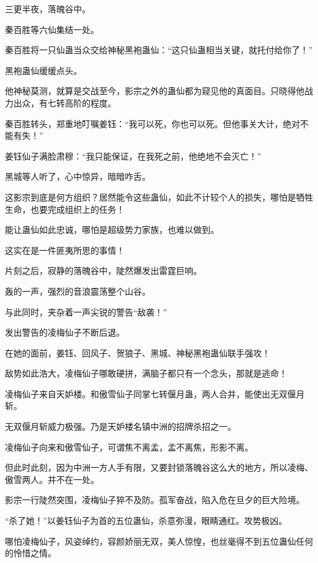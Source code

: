 
\begin{this_body}



三更半夜，落魄谷中。

秦百胜等六仙集结一处。

秦百胜将一只仙蛊当众交给神秘黑袍蛊仙：“这只仙蛊相当关键，就托付给你了！”

黑袍蛊仙缓缓点头。

他神秘莫测，就算是交战至今，影宗之外的蛊仙都为窥见他的真面目。只晓得他战力出众，有七转高阶的程度。

秦百胜转头，郑重地叮嘱姜钰：“我可以死，你也可以死。但他事关大计，绝对不能有失！”

姜钰仙子满脸肃穆：“我只能保证，在我死之前，他绝地不会灭亡！”

黑城等人听了，心中惊异，暗暗咋舌。

这影宗到底是何方组织？居然能令这些蛊仙，如此不计较个人的损失，哪怕是牺牲生命，也要完成组织上的任务！

能让蛊仙如此忠诚，哪怕是超级势力家族，也难以做到。

这实在是一件匪夷所思的事情！

片刻之后，寂静的落魄谷中，陡然爆发出雷霆巨响。

轰的一声，强烈的音浪震荡整个山谷。

与此同时，夹杂着一声尖锐的警告“敌袭！”

发出警告的凌梅仙子不断后退。

在她的面前，姜钰、回风子、贺狼子、黑城、神秘黑袍蛊仙联手强攻！

敌势如此浩大，凌梅仙子哪敢硬拼，满脑子都只有一个念头，那就是逃命！

凌梅仙子来自天妒楼。和傲雪仙子同掌七转偃月蛊，两人合并，能使出无双偃月斩。

无双偃月斩威力极强。乃是天妒楼名镇中洲的招牌杀招之一。

凌梅仙子向来和傲雪仙子，可谓焦不离孟，孟不离焦，形影不离。

但此时此刻，因为中洲一方人手有限，又要封锁落魄谷这么大的地方，所以凌梅、傲雪两人。并不在一处。

影宗一行陡然突围，凌梅仙子猝不及防。孤军奋战，陷入危在旦夕的巨大险境。

“杀了她！”以姜钰仙子为首的五位蛊仙，杀意弥漫，眼睛通红。攻势极凶。

哪怕凌梅仙子，风姿绰约，容颜娇丽无双，美人惊惶，也丝毫得不到五位蛊仙任何的怜惜之情。


\end{this_body}
